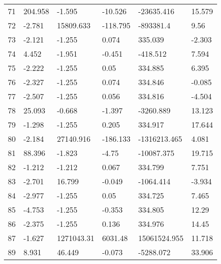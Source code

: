 \documentclass[11pt]{article}
\begin{document}
\begin{center}
\begin{longtable}{llllll}
        71  & 204.958    & -1.595                 & -10.526           & -23635.416         & 15.579   \\
        72  & -2.781     & 15809.633              & -118.795          & -893381.4          & 9.56     \\
        73  & -2.121     & -1.255                 & 0.074             & 335.039            & -2.303   \\
        74  & 4.452      & -1.951                 & -0.451            & -418.512           & 7.594    \\
        75  & -2.222     & -1.255                 & 0.05              & 334.885            & 6.395    \\
        76  & -2.327     & -1.255                 & 0.074             & 334.846            & -0.085   \\
        77  & -2.507     & -1.255                 & 0.056             & 334.816            & -4.504   \\
        78  & 25.093     & -0.668                 & -1.397            & -3260.889          & 13.123   \\
        79  & -1.298     & -1.255                 & 0.205             & 334.917            & 17.644   \\
        80  & -2.184     & 27140.916              & -186.133          & -1316213.465       & 4.081    \\
        81  & 88.396     & -1.823                 & -4.75             & -10087.375         & 19.715   \\
        82  & -1.212     & -1.212                 & 0.067             & 334.799            & 7.751    \\
        83  & -2.701     & 16.799                 & -0.049            & -1064.414          & -3.934   \\
        84  & -2.977     & -1.255                 & 0.05              & 334.725            & 7.465    \\
        85  & -4.753     & -1.255                 & -0.353            & 334.805            & 12.29    \\
        86  & -2.375     & -1.255                 & 0.136             & 334.976            & 14.45    \\
        87  & -1.627     & 1271043.31             & 6031.48           & 15061524.955       & 11.718   \\
        89  & 8.931      & 46.449                 & -0.073            & -5288.072          & 33.906   \\

\end{longtable}
\end{center}
\end{document}
